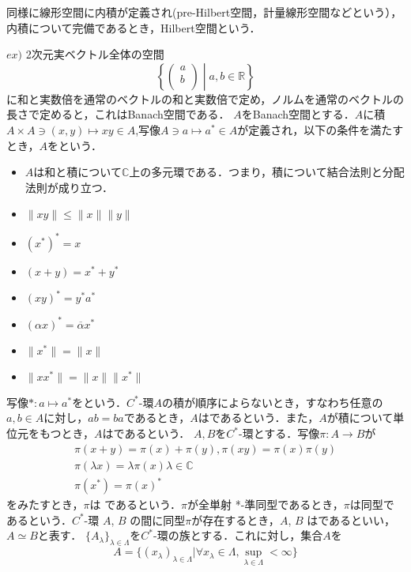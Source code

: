 同様に線形空間に内積が定義され(pre-Hilbert空間，計量線形空間などという），内積について完備であるとき，Hilbert空間という．

$ex)$ 2次元実ベクトル全体の空間
\[\left\{ \left(
\begin{array}{c}
a \\
b \\
\end{array}
\right)\mathrel{}\middle|\mathrel{}a,b\in \mathbb{R}\right\}\]
に和と実数倍を通常のベクトルの和と実数倍で定め，ノルムを通常のベクトルの長さで定めると，これはBanach空間である．
$A$をBanach空間とする．$A$に積$A \times A \ni \left(x,y\right) \mapsto xy \in A$,写像$A\ni a \mapsto a^*\in A$が定義され，以下の条件を満たすとき，$A$をという．
\begin{itemize}
\item $A$は和と積について$\mathbb C$上の多元環である．つまり，積について結合法則と分配法則が成り立つ．
\item $\lVert xy\rVert \leq \lVert x\rVert \lVert y\rVert$
\item $\left(x^*\right)^*=x$
\item $\left(x+y\right)=x^*+y^*$
\item $\left(xy\right)^*=y^*a^*$
\item $\left(\alpha x\right)^*=\overline{\alpha} x^*$
\item $\lVert x^*\rVert=\lVert x\rVert$
\item $\lVert xx^*\rVert=\lVert x\rVert \lVert x^*\rVert$
\end{itemize}
写像$*:a \mapsto a^*$をという．$C^*$-環$A$の積が順序によらないとき，すなわち任意の$a,b\in A$に対し，$ab=ba$であるとき，$A$はであるという．また，$A$が積について単位元をもつとき，$A$はであるという．
$A,B$を$C^*$-環とする．写像$\pi:A \rightarrow B$が
\begin{gather*}
\pi(x+y)=\pi(x)+\pi(y),　\pi(xy)=\pi(x)\pi(y) \\
\pi(\lambda x)=\lambda \pi(x)　\lambda \in \mathbb{C} \\
\pi(x^*)=\pi(x)^*
\end{gather*}
をみたすとき，$\pi$は であるという．$\pi $が全単射 *-準同型であるとき，$\pi$は同型であるという．$C^*$-環 $A$, $B$ の間に同型$\pi$が存在するとき，$A$, $B$ はであるといい，$A\simeq B$と表す．
$\{A_{\lambda}\}_{\lambda \in \Lambda}$を$C^*$-環の族とする．これに対し，集合$A$を
\[A=\{ \left( x_{\lambda}\right)_{\lambda \in \Lambda}|\forall x_{\lambda}\in \Lambda ,
\sup_{\lambda \in \Lambda}<\infty \}\]
